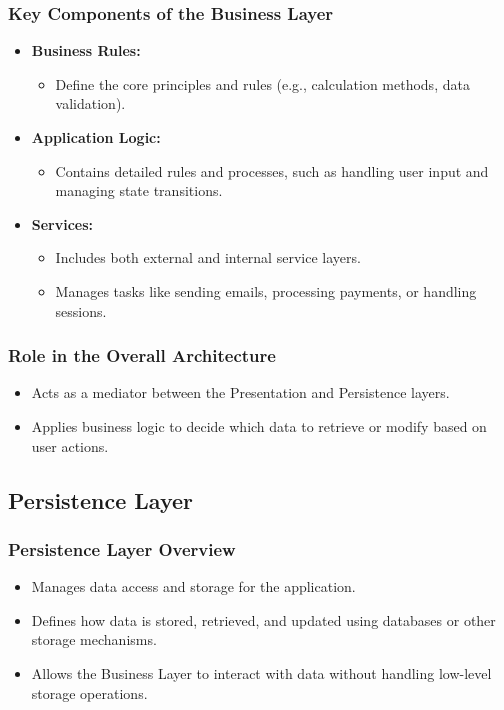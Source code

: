\documentclass[aspectratio=169, table]{beamer}
\begin{document}
\begin{frame}
	\frametitle{Key Components of the Business Layer}
	\begin{itemize}
		\item \textbf{Business Rules:}
		\begin{itemize}
			\item Define the core principles and rules (e.g., calculation methods, data validation).
		\end{itemize}
		\item \textbf{Application Logic:}
		\begin{itemize}
			\item Contains detailed rules and processes, such as handling user input and managing state transitions.
		\end{itemize}
		\item \textbf{Services:}
		\begin{itemize}
			\item Includes both external and internal service layers.
			\item Manages tasks like sending emails, processing payments, or handling sessions.
		\end{itemize}
	\end{itemize}
\end{frame}

\begin{frame}
	\frametitle{Role in the Overall Architecture}
	\begin{itemize}
		\item Acts as a mediator between the Presentation and Persistence layers.
		\item Applies business logic to decide which data to retrieve or modify based on user actions.
	\end{itemize}
\end{frame}

\subsection{Persistence Layer}

\begin{frame}
	\frametitle{Persistence Layer Overview}
	\begin{itemize}
		\item Manages data access and storage for the application.
		\item Defines how data is stored, retrieved, and updated using databases or other storage mechanisms.
		\item Allows the Business Layer to interact with data without handling low-level storage operations.
	\end{itemize}
\end{frame}
\end{document}
